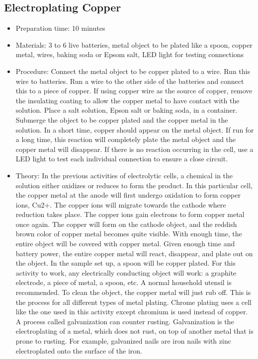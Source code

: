\subsection{Electroplating Copper}
\begin{itemize}
\item{Preparation time: 10 minutes}
\item{Materials: 3 to 6 live batteries, metal object to be plated like a spoon, copper metal, wires, baking soda or Epsom salt, LED light for testing connections}
\item{Procedure: Connect the metal object to be copper plated to a wire. Run this wire to batteries. Run a wire to the other side of the batteries and connect this to a piece of copper. If using copper wire as the source of copper, remove the insulating coating to allow the copper metal to have contact with the solution. Place a salt solution, Epson salt or baking soda, in a container. Submerge the object to be copper plated and the copper metal in the solution. In a short time, copper should appear on the metal object. If run for a long time, this reaction will completely plate the metal object and the copper metal will disappear. If there is no reaction occurring in the cell, use a LED light to test each individual connection to ensure a close circuit.}
\item{Theory: In the previous activities of electrolytic cells, a chemical in the solution either oxidizes or reduces to form the product. In this particular cell, the copper metal at the anode will first undergo oxidation to form copper ions, Cu2+. The copper ions will migrate towards the cathode where reduction takes place. The copper ions gain electrons to form copper metal once again. The copper will form on the cathode object, and the reddish brown color of copper metal becomes quite visible. With enough time, the entire object will be covered with copper metal. Given enough time and battery power, the entire copper metal will react, disappear, and plate out on the object. In the sample set up, a spoon will be copper plated. For this activity to work, any electrically conducting object will work: a graphite electrode, a piece of metal, a spoon, etc. A normal household utensil is recommended. To clean the object, the copper metal will just rub off. This is the process for all different types of metal plating. Chrome plating uses a cell like the one used in this activity except chromium is used instead of copper. A process called galvanization can counter rusting. Galvanization is the electroplating of a metal, which does not rust, on top of another metal that is prone to rusting. For example, galvanized nails are iron nails with zinc electroplated onto the surface of the iron.}
\end{itemize}

